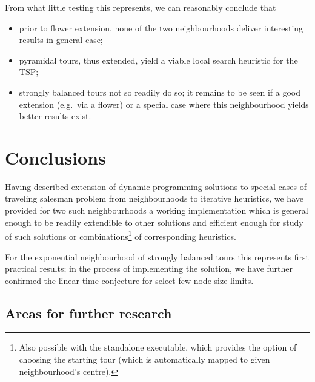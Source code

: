 \documentclass[titlepage,twoside,index=totoc,bibliography=totoc]{scrartcl}
\numberwithin{equation}{section}
\numberwithin{figure}{section}
\numberwithin{table}{section}
\begin{document}
From what little testing this represents, we can reasonably conclude that
\begin{itemize}
  \item prior to flower extension, none of the two neighbourhoods deliver
    interesting results in general case;
  \item pyramidal tours, thus extended, yield a viable local search heuristic for the TSP;
  \item strongly balanced tours not so readily do so;
    it remains to be seen if a good extension (e.g.\ via a flower)
    or a special case where this neighbourhood yields better results
    exist.
\end{itemize}


\section{Conclusions}
\vspace{0.87em}

Having described extension of dynamic programming solutions to special
cases of traveling salesman problem from neighbourhoods to iterative
heuristics,
we have provided for two such neighbourhoods a working implementation which
is general enough to be readily extendible to other solutions and
efficient enough for study of such solutions or combinations\footnote{%
  Also possible with the standalone executable, which
  provides the option of choosing the starting tour
  (which is automatically mapped to given neighbourhood's centre).
}
of corresponding heuristics.

For the exponential neighbourhood of strongly balanced tours this
represents first practical results; in the process of implementing the solution,
we have further confirmed the linear time conjecture for select few node size limits.

\subsection{Areas for further research}
\end{document}
